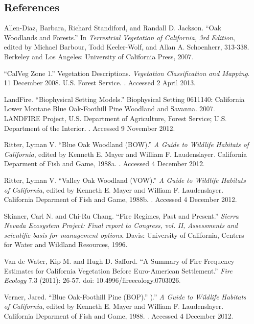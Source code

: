 \subsection*{References}
\begin{hangparas}{.25in}{1} 
Allen-Diaz, Barbara, Richard Standiford, and Randall D. Jackson. ``Oak Woodlands and Forests.'' In \emph{Terrestrial Vegetation of California, 3rd Edition}, edited by Michael Barbour, Todd Keeler-Wolf, and Allan A. Schoenherr, 313-338. Berkeley and Los Angeles: University of California Press, 2007. 

``CalVeg Zone 1.'' Vegetation Descriptions. \emph{Vegetation Classification and Mapping}.  11 December 2008. U.S. Forest Service. . Accessed 2 April 2013.

LandFire. ``Biophysical Setting Models.'' Biophysical Setting 0611140: California Lower Montane Blue Oak-Foothill Pine Woodland and Savanna. 2007. LANDFIRE Project, U.S. Department of Agriculture, Forest Service; U.S. Department of the Interior. . Accessed 9 November 2012.

Ritter, Lyman V. ``Blue Oak Woodland (BOW).'' \emph{A Guide to Wildlife Habitats of California}, edited by Kenneth E. Mayer and William F. Laudenslayer. California Deparment of Fish and Game, 1988a. . Accessed 4 December 2012.

Ritter, Lyman V. ``Valley Oak Woodland (VOW).'' \emph{A Guide to Wildlife Habitats of California}, edited by Kenneth E. Mayer and William F. Laudenslayer. California Deparment of Fish and Game, 1988b. . Accessed 4 December 2012.

Skinner, Carl N. and Chi-Ru Chang. ``Fire Regimes, Past and Present.'' \emph{Sierra Nevada Ecosystem Project: Final report to Congress, vol. II, Assessments and scientific basis for management options}. Davis: University of California, Centers for Water and Wildland Resources, 1996.

Van de Water, Kip M. and Hugh D. Safford. ``A Summary of Fire Frequency Estimates for California Vegetation Before Euro-American Settlement.'' \emph{Fire Ecology} 7.3 (2011): 26-57. doi: 10.4996/fireecology.0703026.

Verner, Jared. ``Blue Oak-Foothill Pine (BOP).'' ).'' \emph{A Guide to Wildlife Habitats of California}, edited by Kenneth E. Mayer and William F. Laudenslayer. California Deparment of Fish and Game, 1988. . Accessed 4 December 2012. 

\end{hangparas}


